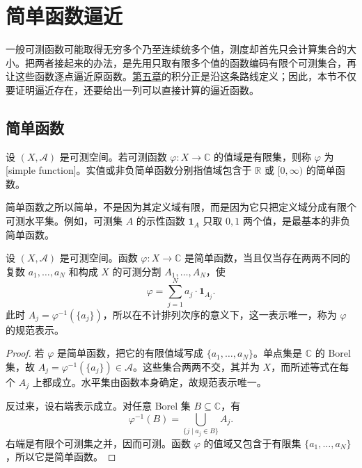 \section{简单函数逼近}
\label{b1:sec:0403}

一般可测函数可能取得无穷多个乃至连续统多个值，测度却首先只会计算集合的大小。把两者接起来的办法，是先用只取有限多个值的函数编码有限个可测集合，再让这些函数逐点逼近原函数。\hyperref[b1:ch:05]{第五章}的积分正是沿这条路线定义；因此，本节不仅要证明逼近存在，还要给出一列可以直接计算的逼近函数。

\subsection{简单函数}
\label{b1:subsec:040301}

\begin{definition}
\label{b1:def:simple-function}
设 \((X,\mathcal A)\) 是可测空间。若可测函数
\(\varphi:X\rightarrow\mathbb C\) 的值域是有限集，则称 \(\varphi\) 为[simple function]。实值或非负简单函数分别指值域包含于 \(\mathbb R\) 或 \([0,\infty)\) 的简单函数。
\end{definition}

简单函数之所以简单，不是因为其定义域有限，而是因为它只把定义域分成有限个可测水平集。例如，可测集 \(A\) 的示性函数 \(\mathbf 1_A\) 只取 \(0,1\) 两个值，是最基本的非负简单函数。

\begin{proposition}
\label{b1:prop:simple-canonical-form}
设 \((X,\mathcal A)\) 是可测空间。函数 \(\varphi:X\rightarrow\mathbb C\) 是简单函数，当且仅当存在两两不同的复数 \(a_1,\ldots,a_N\) 和构成 \(X\) 的可测分割 \(A_1,\ldots,A_N\)，使
\[
\varphi=\sum_{j=1}^{N}a_j\cdot\mathbf 1_{A_j}.
\]
此时 \(A_j=\varphi^{-1}(\{a_j\})\)，所以在不计排列次序的意义下，这一表示唯一，称为 \(\varphi\) 的规范表示。
\end{proposition}
\begin{proof}
若 \(\varphi\) 是简单函数，把它的有限值域写成
\(\{a_1,\ldots,a_N\}\)。单点集是 \(\mathbb C\) 的 Borel 集，故
\(A_j=\varphi^{-1}(\{a_j\})\in\mathcal A\)。这些集合两两不交，其并为 \(X\)，而所述等式在每个 \(A_j\) 上都成立。水平集由函数本身确定，故规范表示唯一。

反过来，设右端表示成立。对任意 Borel 集 \(B\subseteq\mathbb C\)，有
\[
\varphi^{-1}(B)=\bigcup_{\{j\mid a_j\in B\}}A_j.
\]
右端是有限个可测集之并，因而可测。函数 \(\varphi\) 的值域又包含于有限集 \(\{a_1,\ldots,a_N\}\)，所以它是简单函数。
\end{proof}

